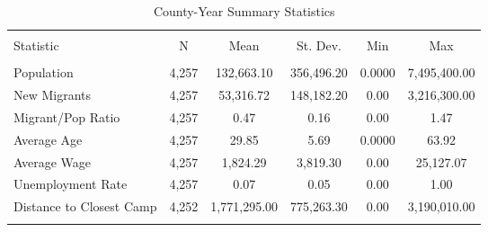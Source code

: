 
\begin{table}[!htbp] \centering 
  \caption{County-Year Summary Statistics} 
  \label{ctysumstats} 
\begin{tabular}{@{\extracolsep{5pt}}lccccc} 
\\[-1.8ex]\hline 
\hline \\[-1.8ex] 
Statistic & \multicolumn{1}{c}{N} & \multicolumn{1}{c}{Mean} & \multicolumn{1}{c}{St. Dev.} & \multicolumn{1}{c}{Min} & \multicolumn{1}{c}{Max} \\ 
\hline \\[-1.8ex] 
Population & 4,257 & 132,663.10 & 356,496.20 & 0.0000 & 7,495,400.00 \\ 
New Migrants & 4,257 & 53,316.72 & 148,182.20 & 0.00 & 3,216,300.00 \\ 
Migrant/Pop Ratio & 4,257 & 0.47 & 0.16 & 0.00 & 1.47 \\ 
Average Age & 4,257 & 29.85 & 5.69 & 0.0000 & 63.92 \\ 
Average Wage & 4,257 & 1,824.29 & 3,819.30 & 0.00 & 25,127.07 \\ 
Unemployment Rate & 4,257 & 0.07 & 0.05 & 0.00 & 1.00 \\ 
Distance to Closest Camp & 4,252 & 1,771,295.00 & 775,263.30 & 0.00 & 3,190,010.00 \\ 
\hline \\[-1.8ex] 
\end{tabular} 
\end{table} 
